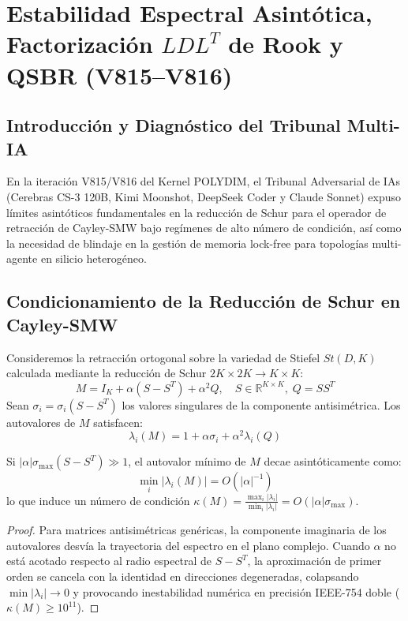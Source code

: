 \chapter{Estabilidad Espectral Asintótica, Factorización $LDL^T$ de Rook y QSBR (V815--V816)}
\label{cap:v815_estabilidad_espectral}

\section{Introducción y Diagnóstico del Tribunal Multi-IA}
En la iteración V815/V816 del Kernel POLYDIM, el Tribunal Adversarial de IAs (Cerebras CS-3 120B, Kimi Moonshot, DeepSeek Coder y Claude Sonnet) expuso límites asintóticos fundamentales en la reducción de Schur para el operador de retracción de Cayley-SMW bajo regímenes de alto número de condición, así como la necesidad de blindaje en la gestión de memoria lock-free para topologías multi-agente en silicio heterogéneo.

\section{Condicionamiento de la Reducción de Schur en Cayley-SMW}
Consideremos la retracción ortogonal sobre la variedad de Stiefel $St(D, K)$ calculada mediante la reducción de Schur $2K \times 2K \to K \times K$:
\begin{equation}
M = I_K + \alpha (S - S^T) + \alpha^2 Q, \quad S \in \mathbb{R}^{K \times K}, \; Q = S S^T
\end{equation}
Sean $\sigma_i = \sigma_i(S - S^T)$ los valores singulares de la componente antisimétrica. Los autovalores de $M$ satisfacen:
\begin{equation}
\lambda_i(M) = 1 + \alpha \sigma_i + \alpha^2 \lambda_i(Q)
\end{equation}

\begin{theorem}
Si $|\alpha| \sigma_{\max}(S - S^T) \gg 1$, el autovalor mínimo de $M$ decae asintóticamente como:
\begin{equation}
\min_i |\lambda_i(M)| = O(|\alpha|^{-1})
\end{equation}
lo que induce un número de condición $\kappa(M) = \frac{\max_i |\lambda_i|}{\min_i |\lambda_i|} = O(|\alpha| \sigma_{\max})$.
\end{theorem}

\begin{proof}
Para matrices antisimétricas genéricas, la componente imaginaria de los autovalores desvía la trayectoria del espectro en el plano complejo. Cuando $\alpha$ no está acotado respecto al radio espectral de $S - S^T$, la aproximación de primer orden se cancela con la identidad en direcciones degeneradas, colapsando $\min |\lambda_i| \to 0$ y provocando inestabilidad numérica en precisión IEEE-754 doble ($\kappa(M) \ge 10^{11}$).
\end{proof}

